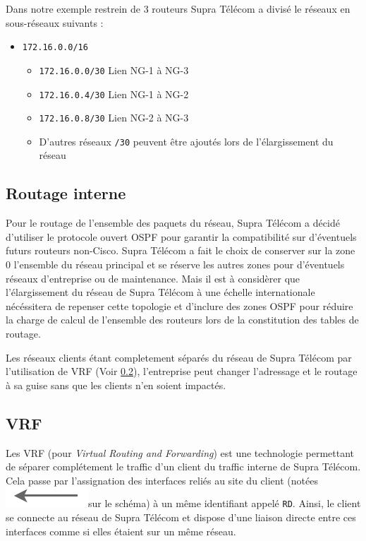 \documentclass{article}
\newcommand{\spr}{Supra Télécom\xspace}
\newcommand{\flechevrf}{\includegraphics[scale=0.4]{img/lien-vrf-fleche}}
\begin{document}
Dans notre exemple restrein de 3 routeurs \spr a divisé le réseaux en sous-réseaux suivants :

\bigskip

\begin{itemize}
	\item \texttt{172.16.0.0/16}
	\begin{itemize}
		\item \texttt{172.16.0.0/30} Lien NG-1 à NG-3
		\item \texttt{172.16.0.4/30} Lien NG-1 à NG-2
		\item \texttt{172.16.0.8/30} Lien NG-2 à NG-3
		\item D'autres réseaux \texttt{/30} peuvent être ajoutés lors de l'élargissement du réseau
	\end{itemize}
\end{itemize}

\bigskip

\subsection{Routage interne}

Pour le routage de l'ensemble des paquets du réseau, \spr a décidé d'utiliser le protocole ouvert OSPF pour garantir la compatibilité sur d'éventuels futurs routeurs non-Cisco.
\spr a fait le choix de conserver sur la zone 0 l'ensemble du réseau principal et se réserve les autres zones pour d'éventuels réseaux d'entreprise ou de maintenance.
Mais il est à considèrer que l'élargissement du réseau de \spr à une échelle internationale nécéssitera de repenser cette topologie et d'inclure des zones OSPF pour réduire la charge de calcul de l'ensemble des routeurs lors de la constitution des tables de routage.

Les réseaux clients étant completement séparés du réseau de \spr par l'utilisation de VRF (Voir \ref{vrf}), l'entreprise peut changer l'adressage et le routage à sa guise sans que les clients n'en soient impactés.

\subsection{VRF}
\label{vrf}

Les VRF (pour \emph{Virtual Routing and Forwarding}) est une technologie permettant de séparer complétement le traffic d'un client du traffic interne de \spr.
Cela passe par l'assignation des interfaces reliés au site du client (notées \flechevrf sur le schéma) à un même identifiant appelé \texttt{RD}.
Ainsi, le client se connecte au réseau de \spr et dispose d'une liaison directe entre ces interfaces comme si elles étaient sur un même réseau.
\end{document}
